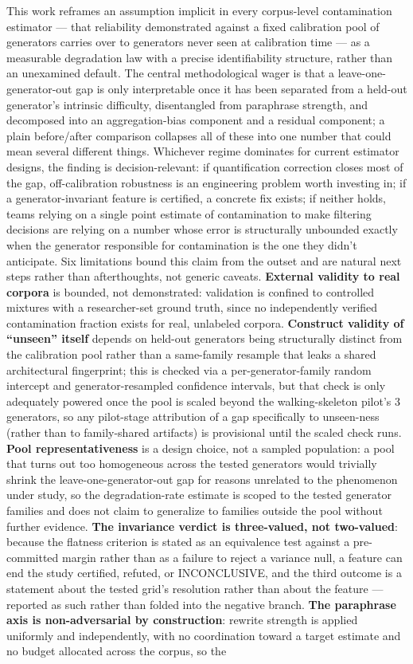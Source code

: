 \documentclass[11pt]{article}
\begin{document}
This work reframes an assumption implicit in every corpus-level contamination estimator --- that reliability demonstrated against a fixed calibration pool of generators carries over to generators never seen at calibration time --- as a measurable degradation law with a precise identifiability structure, rather than an unexamined default. The central methodological wager is that a leave-one-generator-out gap is only interpretable once it has been separated from a held-out generator's intrinsic difficulty, disentangled from paraphrase strength, and decomposed into an aggregation-bias component and a residual component; a plain before/after comparison collapses all of these into one number that could mean several different things. Whichever regime dominates for current estimator designs, the finding is decision-relevant: if quantification correction closes most of the gap, off-calibration robustness is an engineering problem worth investing in; if a generator-invariant feature is certified, a concrete fix exists; if neither holds, teams relying on a single point estimate of contamination to make filtering decisions are relying on a number whose error is structurally unbounded exactly when the generator responsible for contamination is the one they didn't anticipate. Six limitations bound this claim from the outset and are natural next steps rather than afterthoughts, not generic caveats. \textbf{External validity to real corpora} is bounded, not demonstrated: validation is confined to controlled mixtures with a researcher-set ground truth, since no independently verified contamination fraction exists for real, unlabeled corpora. \textbf{Construct validity of ``unseen'' itself} depends on held-out generators being structurally distinct from the calibration pool rather than a same-family resample that leaks a shared architectural fingerprint; this is checked via a per-generator-family random intercept and generator-resampled confidence intervals, but that check is only adequately powered once the pool is scaled beyond the walking-skeleton pilot's 3 generators, so any pilot-stage attribution of a gap specifically to unseen-ness (rather than to family-shared artifacts) is provisional until the scaled check runs. \textbf{Pool representativeness} is a design choice, not a sampled population: a pool that turns out too homogeneous across the tested generators would trivially shrink the leave-one-generator-out gap for reasons unrelated to the phenomenon under study, so the degradation-rate estimate is scoped to the tested generator families and does not claim to generalize to families outside the pool without further evidence. \textbf{The invariance verdict is three-valued, not two-valued}: because the flatness criterion is stated as an equivalence test against a pre-committed margin rather than as a failure to reject a variance null, a feature can end the study certified, refuted, or INCONCLUSIVE, and the third outcome is a statement about the tested grid's resolution rather than about the feature --- reported as such rather than folded into the negative branch. \textbf{The paraphrase axis is non-adversarial by construction}: rewrite strength is applied uniformly and independently, with no coordination toward a target estimate and no budget allocated across the corpus, so the 
\end{document}
